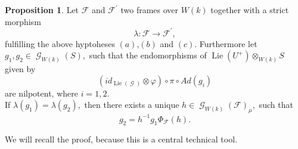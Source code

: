 \documentclass[a4paper,10,5 pt]{amsart}
\theoremstyle{definition}
\newtheorem{proposition}[Satz]{Proposition}
\DeclareMathOperator{\Lie}{Lie}
\DeclareMathOperator{\G}{\mathcal{G}}
\begin{document}
\begin{proposition}\label{Unique lifting lemma}
Let $\mathcal{F}$ and $\mathcal{F}^{\prime}$ two frames over $W(k)$ together with a strict morphism $$\lambda\colon \mathcal{F}\rightarrow \mathcal{F}^{\prime},$$ fulfilling the above hyptoheses $(a)$,$(b)$ and $(c)$. Furthermore let $g_{1},g_{2}\in \G_{W(k)}(S),$ such that the endomorphisms of $\Lie(U^{+})\otimes_{W(k)} S$ given by $$(id_{\Lie(\G)}\otimes \varphi)\circ \pi \circ Ad(g_{i})$$ are nilpotent, where $i=1,2.$
\\
If $\lambda(g_{1})=\lambda(g_{2}),$ then there exists a unique $h\in \G_{W(k)}(\mathcal{F})_{\mu},$ such that
\begin{equation}
g_{2}=h^{-1}g_{1}\Phi_{\mathcal{F}}(h).
\end{equation}
\end{proposition}
We will recall the proof, because this is a central technical tool.
\end{document}
